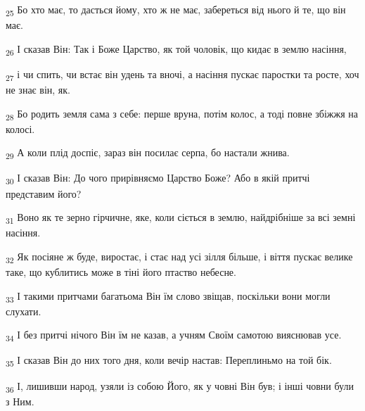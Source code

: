 \begin{tcolorbox}
\textsubscript{25} Бо хто має, то дасться йому, хто ж не має, забереться від нього й те, що він має.
\end{tcolorbox}
\begin{tcolorbox}
\textsubscript{26} І сказав Він: Так і Боже Царство, як той чоловік, що кидає в землю насіння,
\end{tcolorbox}
\begin{tcolorbox}
\textsubscript{27} і чи спить, чи встає він удень та вночі, а насіння пускає паростки та росте, хоч не знає він, як.
\end{tcolorbox}
\begin{tcolorbox}
\textsubscript{28} Бо родить земля сама з себе: перше вруна, потім колос, а тоді повне збіжжя на колосі.
\end{tcolorbox}
\begin{tcolorbox}
\textsubscript{29} А коли плід доспіє, зараз він посилає серпа, бо настали жнива.
\end{tcolorbox}
\begin{tcolorbox}
\textsubscript{30} І сказав Він: До чого прирівняємо Царство Боже? Або в якій притчі представим його?
\end{tcolorbox}
\begin{tcolorbox}
\textsubscript{31} Воно як те зерно гірчичне, яке, коли сіється в землю, найдрібніше за всі земні насіння.
\end{tcolorbox}
\begin{tcolorbox}
\textsubscript{32} Як посіяне ж буде, виростає, і стає над усі зілля більше, і віття пускає велике таке, що кублитись може в тіні його птаство небесне.
\end{tcolorbox}
\begin{tcolorbox}
\textsubscript{33} І такими притчами багатьома Він їм слово звіщав, поскільки вони могли слухати.
\end{tcolorbox}
\begin{tcolorbox}
\textsubscript{34} І без притчі нічого Він їм не казав, а учням Своїм самотою вияснював усе.
\end{tcolorbox}
\begin{tcolorbox}
\textsubscript{35} І сказав Він до них того дня, коли вечір настав: Переплиньмо на той бік.
\end{tcolorbox}
\begin{tcolorbox}
\textsubscript{36} І, лишивши народ, узяли із собою Його, як у човні Він був; і інші човни були з Ним.
\end{tcolorbox}
